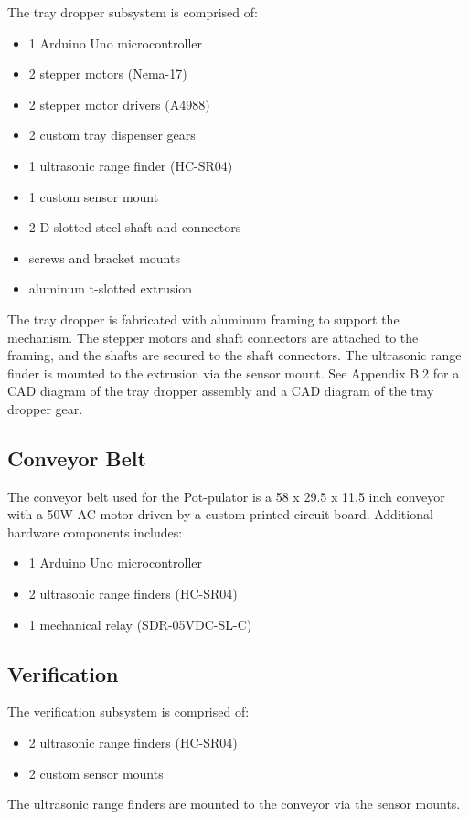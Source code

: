 \documentclass[12pt, titlepage]{article}
\begin{document}
The tray dropper subsystem is comprised of:
\begin{itemize}
  \item 1 Arduino Uno microcontroller
  \item 2 stepper motors (Nema-17)
  \item 2 stepper motor drivers (A4988)
  \item 2 custom tray dispenser gears
  \item 1 ultrasonic range finder (HC-SR04)
  \item 1 custom sensor mount
  \item 2 D-slotted steel shaft and connectors
  \item screws and bracket mounts
  \item aluminum t-slotted extrusion
\end{itemize}
The tray dropper is fabricated with aluminum framing to support the mechanism. The 
stepper motors and shaft connectors are attached to the framing, and the shafts 
are secured to the shaft connectors. The ultrasonic range finder is mounted to the 
extrusion via the sensor mount. See Appendix B.2 for a CAD diagram of the tray dropper assembly 
and a CAD diagram of the tray dropper gear.

\subsection{Conveyor Belt}

The conveyor belt used for the Pot-pulator is a 58 x 29.5 x 11.5 inch conveyor with a 50W AC motor driven by a custom printed
circuit board. Additional hardware components includes:
\begin{itemize}
  \item 1 Arduino Uno microcontroller
  \item 2 ultrasonic range finders (HC-SR04)
  \item 1 mechanical relay (SDR-05VDC-SL-C)
\end{itemize}

\subsection{Verification}

The verification subsystem is comprised of:
\begin{itemize}
  \item 2 ultrasonic range finders (HC-SR04)
  \item 2 custom sensor mounts
\end{itemize}
The ultrasonic range finders are mounted to the conveyor via the sensor mounts.
\end{document}
